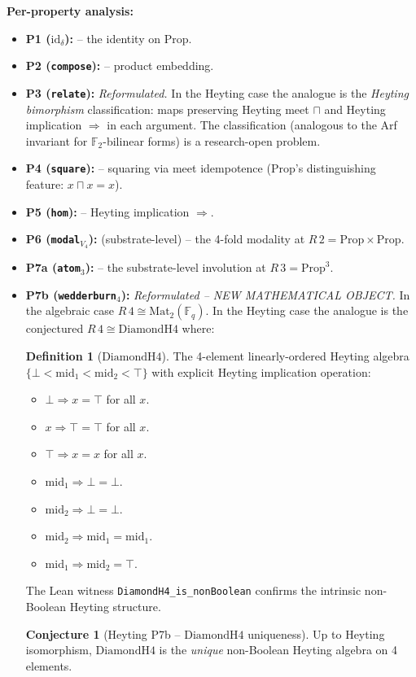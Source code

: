 \documentclass[11pt,a4paper]{article}
\theoremstyle{plain}
\theoremstyle{definition}
\newtheorem{definition}[theorem]{Definition}
\newtheorem{conjecture}[theorem]{Conjecture}
\theoremstyle{remark}
\newcommand{\F}{\mathbb{F}}
\newcommand{\Mat}{\mathrm{Mat}}
\newcommand{\id}{\mathrm{id}}
\newcommand{\DiamondH}{\mathrm{DiamondH4}}
\begin{document}
\textbf{Per-property analysis:}

\begin{itemize}[leftmargin=*]
\item \textbf{P1 ($\id_\delta$):} \checkmark{} -- the identity on $\mathrm{Prop}$.
\item \textbf{P2 (\texttt{compose}):} \checkmark{} -- product embedding.
\item \textbf{P3 (\texttt{relate}):} \emph{Reformulated.} In the Heyting case the analogue is the \emph{Heyting bimorphism} classification: maps preserving Heyting meet $\sqcap$ and Heyting implication $\Rightarrow$ in each argument. The classification (analogous to the Arf invariant for $\F_2$-bilinear forms) is a research-open problem.
\item \textbf{P4 (\texttt{square}):} \checkmark{} -- squaring via meet idempotence ($\mathrm{Prop}$'s distinguishing feature: $x \sqcap x = x$).
\item \textbf{P5 (\texttt{hom}):} \checkmark{} -- Heyting implication $\Rightarrow$.
\item \textbf{P6 (\texttt{modal}$_{V_4}$):} \checkmark{} (substrate-level) -- the 4-fold modality at $R\,2 = \mathrm{Prop} \times \mathrm{Prop}$.
\item \textbf{P7a (\texttt{atom}$_3$):} \checkmark{} -- the substrate-level involution at $R\,3 = \mathrm{Prop}^3$.
\item \textbf{P7b (\texttt{wedderburn}$_4$):} \emph{Reformulated -- NEW MATHEMATICAL OBJECT.} In the algebraic case $R\,4 \cong \Mat_2(\F_q)$. In the Heyting case the analogue is the conjectured $R\,4 \cong \DiamondH$ where:

\begin{definition}[$\DiamondH$]\label{def:diamondH4}
The 4-element linearly-ordered Heyting algebra $\{\bot < \mathrm{mid}_1 < \mathrm{mid}_2 < \top\}$ with explicit Heyting implication operation:
\begin{itemize}
\item $\bot \Rightarrow x = \top$ for all $x$.
\item $x \Rightarrow \top = \top$ for all $x$.
\item $\top \Rightarrow x = x$ for all $x$.
\item $\mathrm{mid}_1 \Rightarrow \bot = \bot$.
\item $\mathrm{mid}_2 \Rightarrow \bot = \bot$.
\item $\mathrm{mid}_2 \Rightarrow \mathrm{mid}_1 = \mathrm{mid}_1$.
\item $\mathrm{mid}_1 \Rightarrow \mathrm{mid}_2 = \top$.
\end{itemize}
\end{definition}

The Lean witness \texttt{DiamondH4\_is\_nonBoolean} confirms the intrinsic non-Boolean Heyting structure.

\begin{conjecture}[Heyting P7b -- $\DiamondH$ uniqueness]\label{conj:diamondH4-unique}
Up to Heyting isomorphism, $\DiamondH$ is the \emph{unique} non-Boolean Heyting algebra on 4 elements.
\end{conjecture}
\end{itemize}
\end{document}
